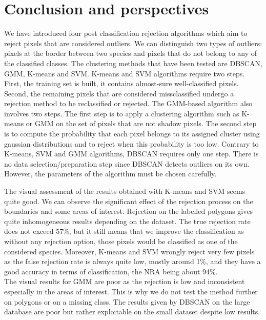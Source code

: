 \documentclass{siamart171218}
\begin{document}
\newpage
\section{Conclusion and perspectives}

We have introduced four post classification rejection algorithms which aim to reject pixels that are considered outliers. We can distinguish two types of outliers: pixels at the border between two species and pixels that do not belong to any of the classified classes. The clustering methods that have been tested are DBSCAN, GMM, K-means and SVM. K-means and SVM algorithms require two steps. First, the training set is built, it contains almost-sure well-classified pixels. Second, the remaining pixels that are considered missclassified undergo a rejection method to be reclassified or rejected. 
The GMM-based algorithm also involves two steps. The first step is to apply a clustering algorithm such as K-means or GMM on the set of pixels that are not shadow pixels. The second step is to compute the probability that each pixel belongs to its assigned cluster using gaussian distributions and to reject when this probability is too low. Contrary to K-means, SVM and GMM algorithms, DBSCAN requires only one step. There is no data selection/preparation step since DBSCAN detects outliers on its own. However, the parameters of the algorithm must be chosen carefully. 

The visual assessment of the results obtained with K-means and SVM seems quite good. We can observe the significant effect of the rejection process on the boundaries and some areas of interest. Rejection on the labelled polygons gives quite inhomogeneous results depending on the dataset. The true rejection rate does not exceed 57\%, but it still means that we improve the classification as without any rejection option, those pixels would be classified as one of the considered species. 
Moreover, K-means and SVM wrongly reject very few pixels as the false rejection rate is always quite low, mostly around 1\%, and they have a good accuracy in terms of classification, the NRA being about 94\%. \\
The visual results for GMM are poor as the rejection is low and inconsistent especially in the areas of interest. This is why we do not test the method further on polygons or on a missing class. The results given by DBSCAN on the large database are poor but rather exploitable on the small dataset despite low results. 
\end{document}
